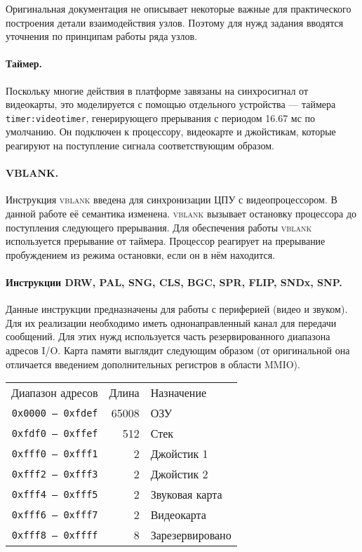 Оригинальная документация не описывает некоторые важные для практического построения детали взаимодействия узлов. Поэтому для нужд задания вводятся уточнения по принципам работы ряда узлов.

\paragraph{Таймер.} Поскольку многие действия в платформе завязаны на синхросигнал от видеокарты, это моделируется с помощью отдельного устройства --- таймера \texttt{timer:videotimer}, генерирующего прерывания с периодом 16.67 мс по умолчанию. Он подключен к процессору, видеокарте и джойстикам, которые реагируют на поступление сигнала соответствующим образом.

\paragraph{VBLANK.} Инструкция \textsc{vblank} введена для синхронизации ЦПУ с видеопроцессором. В данной работе её семантика изменена. \textsc{vblank} вызывает остановку процессора до поступления следующего прерывания. Для обеспечения работы \textsc{vblank} используется прерывание от таймера. Процессор реагирует на прерывание пробуждением из режима остановки, если он в нём находится.

\paragraph{Инструкции DRW, PAL, SNG, CLS, BGC, SPR, FLIP, SNDx, SNP.} Данные инструкции предназначены для работы с периферией (видео и звуком). Для их реализации необходимо иметь однонаправленный канал для передачи сообщений. Для этих нужд используется  часть резервированного диапазона адресов I/O. Карта памяти выглядит следующим образом (от оригинальной она отличается введением дополнительных регистров в области MMIO).

\begin{tabular}{rrl}
Диапазон адресов         & Длина & Назначение \\
\texttt{0x0000 -- 0xfdef}& 65008 & ОЗУ        \\
\texttt{0xfdf0 -- 0xffef}& 512   & Стек       \\
\texttt{0xfff0 -- 0xfff1}& 2     & Джойстик 1 \\
\texttt{0xfff2 -- 0xfff3}& 2     & Джойстик 2 \\
\texttt{0xfff4 -- 0xfff5}& 2     & Звуковая карта \\
\texttt{0xfff6 -- 0xfff7}& 2     & Видеокарта \\
\texttt{0xfff8 -- 0xffff}& 8     & Зарезервировано \\
\end{tabular}

